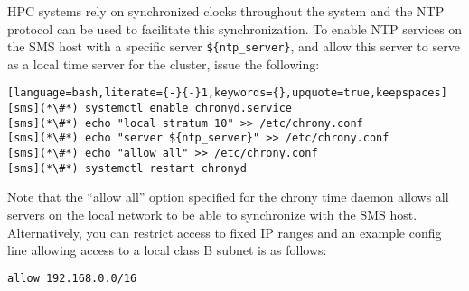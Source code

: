 HPC systems rely on synchronized clocks throughout the system and the
NTP protocol can be used to facilitate this synchronization. To enable NTP
services on the SMS host with a specific server \texttt{\$\{ntp\_server\}}, and
allow this server to serve as a local time server for the cluster,
issue the following:

\begin{lstlisting}[language=bash,literate={-}{-}1,keywords={},upquote=true,keepspaces]
[sms](*\#*) systemctl enable chronyd.service
[sms](*\#*) echo "local stratum 10" >> /etc/chrony.conf
[sms](*\#*) echo "server ${ntp_server}" >> /etc/chrony.conf
[sms](*\#*) echo "allow all" >> /etc/chrony.conf
[sms](*\#*) systemctl restart chronyd
\end{lstlisting}

\begin{center}
\begin{tcolorbox}[]
\small Note that the ``allow all'' option specified for the chrony time daemon
allows all servers on the local network to be able to synchronize with the SMS
host. Alternatively, you can restrict access to fixed IP ranges and an example
config line allowing access to a local class B subnet is as follows:
\begin{lstlisting}[language=bash]
allow 192.168.0.0/16
\end{lstlisting}
\end{tcolorbox}
\end{center}
